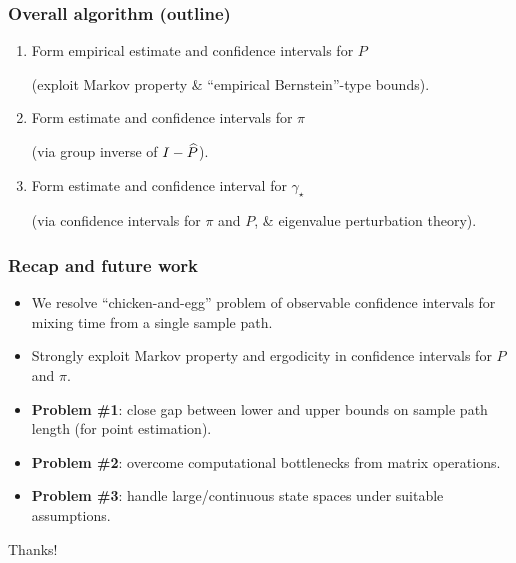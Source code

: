 \documentclass[11pt,compress,blue4,notheorems,handout]{beamer}
\newcommand\fns\footnotesize
\newcommand\gap{\ensuremath{\gamma_{\star}}}
\begin{document}
\begin{frame}
  \frametitle{Overall algorithm (outline)}

  \begin{enumerate}
    \item
      Form empirical estimate and confidence intervals for $P$

      {\fns(exploit Markov property \& ``empirical Bernstein''-type bounds)}.

      \medskip

    \item
      Form estimate and confidence intervals for $\pi$

      {\fns(via group inverse of $I - \widehat P$)}.

      \medskip

    \item
      Form estimate and confidence interval for $\gap$

      {\fns(via confidence intervals for $\pi$ and $P$, \& eigenvalue perturbation theory)}.

  \end{enumerate}
\end{frame}


\begin{frame}
  \frametitle{Recap and future work}

  \begin{itemize}
    \item
      We resolve ``chicken-and-egg'' problem of observable
      confidence intervals for mixing time from a single sample path.

    \item<2->
      Strongly exploit Markov property and ergodicity in confidence
      intervals for $P$ and $\pi$.

    \item<3->
      \textbf{Problem \#1}:
      \textcolor{britishracinggreen}{%
        close gap between lower and upper bounds on sample path length
        (for point estimation).%
      }

    \item<4->
      \textbf{Problem \#2}:
      \textcolor{britishracinggreen}{%
        overcome computational bottlenecks from matrix operations.%
      }

    \item<5->
      \textbf{Problem \#3}:
      \textcolor{boldgreen}{%
        handle large/continuous state spaces under suitable
        assumptions.%
      }

  \end{itemize}

\end{frame}


\begin{frame}
  \begin{center}
    \Huge
    Thanks!
  \end{center}
\end{frame}

\end{document}
